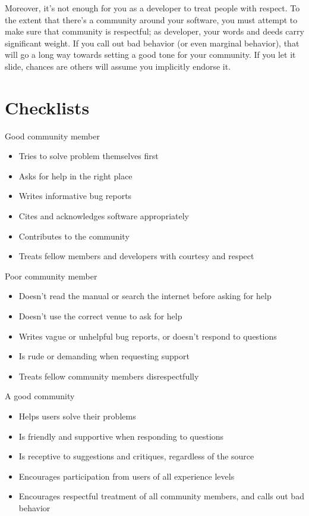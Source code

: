 \documentclass[9pt,training]{livecoms}
\begin{document}
Moreover, it's not enough for you as a developer to treat people with respect.
To the extent that there's a community around your software, you must attempt to
make sure that community is respectful; as developer, your words and deeds carry
significant weight. If you call out bad behavior (or even marginal behavior),
that will go a long way towards setting a good tone for your community. If you
let it slide, chances are others will assume you implicitly endorse it.

\section{Checklists}
\begin{Checklists}

\begin{checklist}{Good community member}
\begin{itemize}
\item Tries to solve problem themselves first
\item Asks for help in the right place
\item Writes informative bug reports
\item Cites and acknowledges software appropriately
\item Contributes to the community
\item Treats fellow members and developers with courtesy and respect
\end{itemize}
\end{checklist}

\begin{checklist}{Poor community member}
\begin{itemize}
\item Doesn't read the manual or search the internet before asking for help
\item Doesn't use the correct venue to ask for help
\item Writes vague or unhelpful bug reports, or doesn't respond to questions
\item Is rude or demanding when requesting support
\item Treats fellow community members disrespectfully
\end{itemize}
\end{checklist}

\begin{checklist}{A good community}
\begin{itemize}
\item Helps users solve their problems
\item Is friendly and supportive when responding to questions
\item Is receptive to suggestions and critiques, regardless of the source
\item Encourages participation from users of all experience levels
\item Encourages respectful treatment of all community members, and calls out bad behavior
\end{itemize}
\end{checklist}

\end{Checklists}
\end{document}
